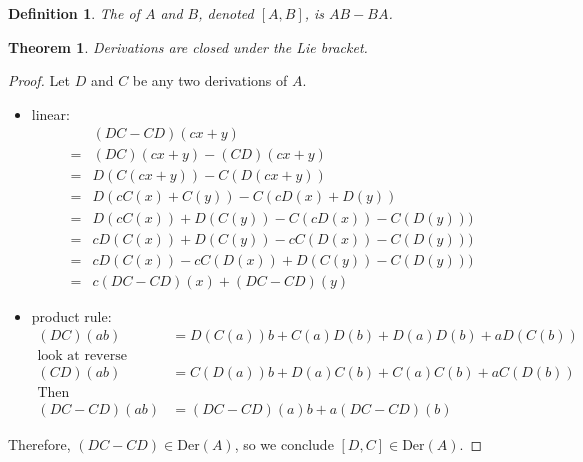 \documentclass[11pt]{amsbook}
\theoremstyle{mystyle} \newtheorem{thrm}[thm]{Theorem}
\theoremstyle{mystyle} \newtheorem{defi}[thm]{Definition}
\theoremstyle{mystyle} \newtheorem{coro}[thm]{Corollary}
\theoremstyle{mystyle} \newtheorem{propo}[thm]{Proposition}
\theoremstyle{mystyle} \newtheorem{lemm}[thm]{Lemma}
\numberwithin{thm}{section}
\newcommand{\Der}{\text{Der}}
\begin{document}
\begin{defi}
	The  of $A$ and $B$, denoted $[A,B]$, is $AB - BA$.
\end{defi}
\begin{thrm}
	Derivations are closed under the Lie bracket.
\end{thrm}
\begin{proof}
	Let $D$ and $C$ be any two derivations of $A$.
	\begin{itemize}
		\item linear:
		\begin{align}
			& (DC - CD)(cx + y) \\
			=& (DC)(cx + y) - (CD)(cx + y) \\
			=& D(C(cx + y)) - C(D(cx + y)) \\
			=& D(cC(x) + C(y)) - C(cD(x) + D(y)) \\
			=& D(cC(x)) + D(C(y)) - C(cD(x)) - C(D(y))) \\
			=& cD(C(x)) + D(C(y)) - cC(D(x)) - C(D(y))) \\
			=& cD(C(x)) - cC(D(x))+  D(C(y)) - C(D(y))) \\
			=& c(DC-CD)(x)      +    (DC-CD)(y)
		\end{align}
		\item product rule:
		\begin{align}
			(DC)(ab) &= D(C(a))b + C(a)D(b) + D(a)D(b) + aD(C(b)) \\
			\text{look at reverse} \\
			(CD)(ab) &= C(D(a))b + D(a)C(b) + C(a)C(b) + aC(D(b)) \\
			\text{Then} \\
			(DC - CD)(ab) &= (DC - CD)(a)b + a(DC - CD)(b)
		\end{align}
	\end{itemize}
	Therefore,  $(DC - CD) \in \Der(A)$, so we conclude $[D,C] \in \Der(A)$.
\end{proof}
\end{document}
